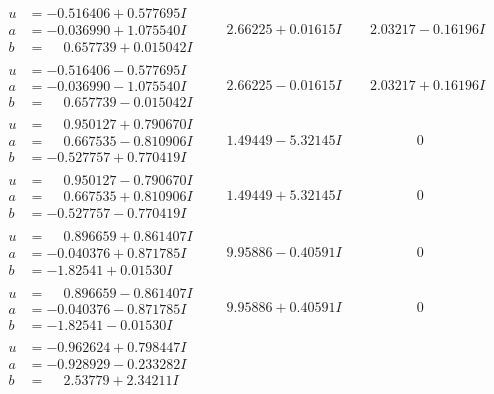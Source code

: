 \documentclass[1p]{elsarticle_modified}
\theoremstyle{definition}
\begin{document}
$$\begin{array}{c|c|c}
\begin{aligned}
u &= -0.516406 + 0.577695 I \\
a &= -0.036990 + 1.075540 I \\
b &= \phantom{-}0.657739 + 0.015042 I\end{aligned}
 & \phantom{-}2.66225 + 0.01615 I & \phantom{-}2.03217 - 0.16196 I \\ \hline\begin{aligned}
u &= -0.516406 - 0.577695 I \\
a &= -0.036990 - 1.075540 I \\
b &= \phantom{-}0.657739 - 0.015042 I\end{aligned}
 & \phantom{-}2.66225 - 0.01615 I & \phantom{-}2.03217 + 0.16196 I \\ \hline\begin{aligned}
u &= \phantom{-}0.950127 + 0.790670 I \\
a &= \phantom{-}0.667535 - 0.810906 I \\
b &= -0.527757 + 0.770419 I\end{aligned}
 & \phantom{-}1.49449 - 5.32145 I & \phantom{-0.000000 } 0 \\ \hline\begin{aligned}
u &= \phantom{-}0.950127 - 0.790670 I \\
a &= \phantom{-}0.667535 + 0.810906 I \\
b &= -0.527757 - 0.770419 I\end{aligned}
 & \phantom{-}1.49449 + 5.32145 I & \phantom{-0.000000 } 0 \\ \hline\begin{aligned}
u &= \phantom{-}0.896659 + 0.861407 I \\
a &= -0.040376 + 0.871785 I \\
b &= -1.82541 + 0.01530 I\end{aligned}
 & \phantom{-}9.95886 - 0.40591 I & \phantom{-0.000000 } 0 \\ \hline\begin{aligned}
u &= \phantom{-}0.896659 - 0.861407 I \\
a &= -0.040376 - 0.871785 I \\
b &= -1.82541 - 0.01530 I\end{aligned}
 & \phantom{-}9.95886 + 0.40591 I & \phantom{-0.000000 } 0 \\ \hline\begin{aligned}
u &= -0.962624 + 0.798447 I \\
a &= -0.928929 - 0.233282 I \\
b &= \phantom{-}2.53779 + 2.34211 I\end{aligned}

\end{array}$$
\end{document}
